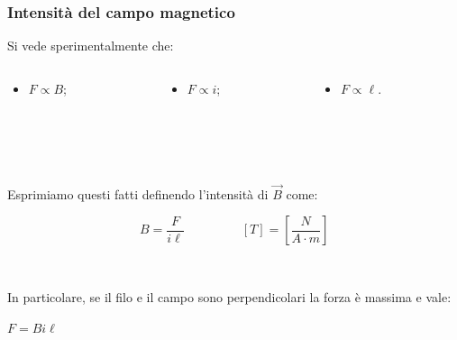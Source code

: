 \documentclass[]{beamer}
\theoremstyle{plain}
\begin{document}
\begin{frame}
\frametitle{Intensità del campo magnetico}
Si vede sperimentalmente che:
\begin{columns}
\begin{column}{0.3\textwidth}
\begin{itemize}
  \item $ F \propto B $;
\end{itemize}
\end{column}
\begin{column}{0.3\textwidth}
\begin{itemize}
  \item $ F \propto i $;
\end{itemize}
\end{column}
\begin{column}{0.3\textwidth}
\begin{itemize}
  \item $ F \propto \ell $.
\end{itemize}
\end{column}
\end{columns}\pause

~

~

Esprimiamo questi fatti definendo l'intensità di $ \vec{B} $ come:
\begin{center}
~~~~~~~~~~~~~~~~~~~~~\colorbox{blue!30}{$ B = \dfrac{F}{i\ell} $}\pause~~~~~~~~~$ \left[ T \right] = \left[ \dfrac{N}{A\cdot m} \right] $
\end{center}\pause

~

In particolare, \alert<4>{se il filo e il campo sono perpendicolari la forza è massima e vale:}
\begin{center}
\colorbox{blue!30}{$ F=Bi\ell $}
\end{center}
\end{frame}
\end{document}
